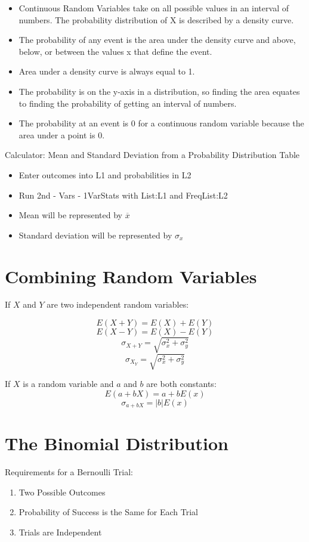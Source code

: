 \documentclass[../stats.tex]{subfiles}
\begin{document}
\begin{itemize}
    \item Continuous Random Variables take on all possible values in an interval of numbers. The probability distribution of X is described by a density curve.
    \item The probability of any event is the area under the density curve and above, below, or between the values x that define the event.
    \item Area under a density curve is always equal to 1.
    \item The probability is on the y-axis in a distribution, so finding the area equates to finding the probability of getting an interval of numbers.
    \item The probability at an event is 0 for a continuous random variable because the area under a point is 0.
\end{itemize}

Calculator: Mean and Standard Deviation from a Probability Distribution Table 
\begin{itemize}
    \item Enter outcomes into L1 and probabilities in L2 
    \item Run 2nd - Vars - 1VarStats with List:L1 and FreqList:L2 
    \item Mean will be represented by $\overline{x}$
    \item Standard deviation will be represented by $\sigma_x$
\end{itemize}

\section{Combining Random Variables}
If $X$ and $Y$ are two independent random variables:

\[E(X+Y)=E(X)+E(Y)\]
\[E(X-Y)=E(X)-E(Y)\]
\[\sigma_{X+Y}=\sqrt{\sigma_x^2 + \sigma_y^2}\]
\[\sigma_{X_Y}=\sqrt{\sigma_x^2 + \sigma_y^2}\]

If $X$ is a random variable and $a$ and $b$ are both constants:
\[E(a+bX)=a+bE(x)\]
\[\sigma_{a+bX}=|b|E(x)\]

\section{The Binomial Distribution}
Requirements for a Bernoulli Trial:
\begin{enumerate}
    \item Two Possible Outcomes 
    \item Probability of Success is the Same for Each Trial 
    \item Trials are Independent 
\end{enumerate}
\end{document}
